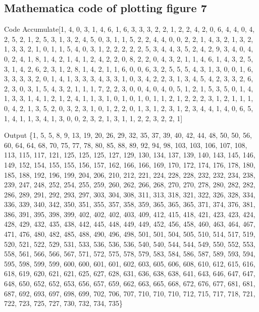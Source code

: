 \documentclass[a4paper,12pt]{article}
\begin{document}
\subsection{Mathematica code of plotting figure 7}
\begin{mmaCell}[functionlocal=y]{Code}
  Accumulate[{1, 4, 0, 3, 1, 4, 6, 1, 6, 3, 3, 3, 2, 
  2, 1, 2, 2, 4, 2, 0, 6, 4, 4, 0, 4, 2, 5, 2, 1, 2, 5, 
  3, 1, 3, 2, 4, 5, 0, 3, 1, 1, 5, 2, 2, 4, 4, 0, 0, 2,
  2, 1, 4, 3, 2, 1, 3, 2, 1, 3, 3, 2, 1, 0, 1, 1, 5, 4, 
  0, 3, 1, 2, 2, 2, 2, 2, 5, 3, 4, 4, 3, 5, 2, 4, 2, 9, 
  3, 4, 0, 4, 0, 2, 4, 1, 8, 1, 4, 2, 1, 4, 1, 2, 4, 2, 
  2, 0, 8, 2, 2, 0, 4, 3, 2, 1, 1, 4, 6, 1, 4, 3, 2, 5, 
  3, 1, 4, 2, 6, 2, 3, 1, 2, 8, 1, 4, 2, 1, 1, 6, 0, 0, 
  6, 3, 2, 5, 5, 5, 4, 3, 1, 3, 0, 0, 1, 6, 3, 3, 3, 3, 
  2, 0, 1, 4, 1, 3, 3, 3, 4, 3, 3, 1, 0, 3, 4, 2, 2, 3, 
  1, 3, 4, 5, 4, 2, 3, 3, 2, 6, 2, 3, 0, 3, 1, 5, 4, 3, 
  2, 1, 1, 1, 7, 2, 2, 3, 0, 0, 4, 0, 4, 0, 5, 1, 2, 1, 
  5, 3, 5, 0, 1, 4, 1, 3, 3, 1, 4, 1, 2, 1, 2, 4, 1, 1, 
  3, 1, 0, 1, 0, 1, 0, 1, 1, 2, 1, 2, 2, 2, 3, 1, 2, 1, 
  1, 1, 0, 4, 2, 1, 3, 5, 2, 0, 3, 2, 3, 1, 0, 1, 2, 2, 
  0, 1, 3, 1, 2, 3, 1, 2, 3, 4, 4, 1, 4, 0, 6, 5, 1, 4, 
  1, 1, 3, 4, 1, 3, 0, 0, 2, 3, 2, 1, 3, 1, 1, 2, 2, 3, 
  2, 2, 1}]

\end{mmaCell}
\begin{mmaCell}{Output}
  \{1, 5, 5, 8, 9, 13, 19, 20, 26, 29, 32, 35, 37, 39, 40, 
  42, 44, 48, 50, 50, 56, 60, 64, 64, 68, 70, 75, 77, 
  78, 80, 85, 88, 89, 92, 94, 98, 103, 103, 106, 107,
  108, 113, 115, 117, 121, 125, 125, 125, 127, 129, 
  130, 134, 137, 139, 140, 143, 145, 146, 149, 152,
  154, 155, 155, 156, 157, 162, 166, 166, 169, 170,
  172, 174, 176, 178, 180, 185, 188, 192, 196, 199,
  204, 206, 210, 212, 221, 224, 228, 228, 232, 232,
  234, 238, 239, 247, 248, 252, 254, 255, 259, 260,
  262, 266, 268, 270, 270, 278, 280, 282, 282, 286,
  289, 291, 292, 293, 297, 303, 304, 308, 311, 313, 
  318, 321, 322, 326, 328, 334, 336, 339, 340, 342, 
  350, 351, 355, 357, 358, 359, 365, 365, 365, 371, 
  374, 376, 381, 386, 391, 395, 398, 399, 402, 402, 
  402, 403, 409, 412, 415, 418, 421, 423, 423, 424,
  428, 429, 432, 435, 438, 442, 445, 448, 449, 449,
  452, 456, 458, 460, 463, 464, 467, 471, 476, 480,
  482, 485, 488, 490, 496, 498, 501, 501, 504, 505, 
  510, 514, 517, 519, 520, 521, 522, 529, 531, 533,
  536, 536, 536, 540, 540, 544, 544, 549, 550, 552,
  553, 558, 561, 566, 566, 567, 571, 572, 575, 578, 
  579, 583, 584, 586, 587, 589, 593, 594, 595, 598,
  599, 599, 600, 600, 601, 601, 602, 603, 605, 606, 
  608, 610, 612, 615, 616, 618, 619, 620, 621, 621,
  625, 627, 628, 631, 636, 638, 638, 641, 643, 646,
  647, 647, 648, 650, 652, 652, 653, 656, 657, 659,
  662, 663, 665, 668, 672, 676, 677, 681, 681, 687, 
  692, 693, 697, 698, 699, 702, 706, 707, 710, 710, 
  710, 712, 715, 717, 718, 721, 722, 723, 725, 727, 
  730, 732, 734, 735\}
\end{mmaCell}
\end{document}
